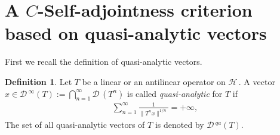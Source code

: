 \documentclass[12pt]{amsart}
\theoremstyle{definition}
\newtheorem{defn}[thm]{Definition}
\newcommand{\cD}{\mathcal{D}\,}
\newcommand{\cH}{\mathcal{H}\,}
\begin{document}
\section{A $C$-Self-adjointness criterion based on quasi-analytic vectors}\label{quasianalytic}

First we recall the  definition of quasi-analytic vectors.

\begin{defn} Let $T$ be a linear or an antilinear operator on $\cH$. A vector $x\in \cD^\infty (T):=\bigcap_{n=1}^\infty \cD(T^n)$ is called \emph{quasi-analytic} for $T$ if
\begin{align*}%
\sum_{n=1}^\infty \frac{1}{\|T^n x\|^{1/n} }=+\infty,
\end{align*}
The set of all quasi-analytic vectors of $T$ is denoted by $\cD^{qa}(T)$.
\end{defn}
\end{document}
